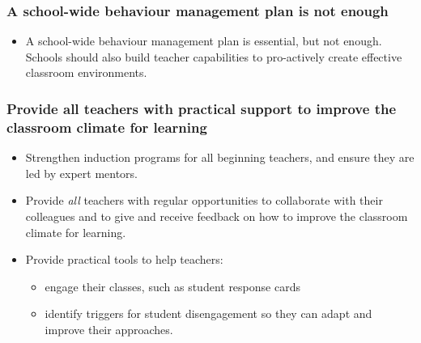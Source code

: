 \documentclass{grattan}
\begin{document}
\begin{recommendations}\label{chap:recommendations}\raggedright%
\label{sec:recommendation-1-school-level}
\subsubsection{A school-wide behaviour management plan is not enough}\label{subsubsec:school-wide-behaviour-management-plan}

\begin{itemize}
    \item A school-wide behaviour management plan is essential, but not enough. Schools should also build teacher capabilities to pro-actively create effective classroom environments.
\end{itemize}

\subsubsection{Provide all teachers with practical support to improve the classroom climate for learning}\label{subsubsec:provide-all-teachers-practical-support}

\begin{itemize}
    \item Strengthen induction programs for all beginning teachers, and ensure they are led by expert mentors.
    \item Provide \emph{all} teachers with regular opportunities to collaborate with their colleagues and to give and receive feedback on how to improve the classroom climate for learning.
    \item Provide practical tools to help teachers:
    \begin{itemize}
        \item engage their classes, such as student response cards
        \item identify triggers for student disengagement so they can adapt and improve their approaches.
    \end{itemize}
\end{itemize}



\end{recommendations}
\end{document}
